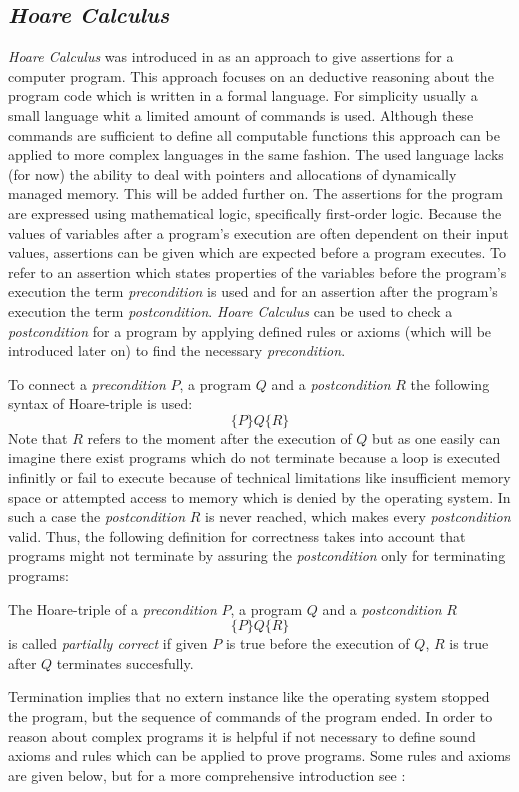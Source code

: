 	\subsection{\emph{Hoare Calculus}}
	\emph{Hoare Calculus} was introduced in \cite{hoarecalc} as an approach to
	give assertions for a computer program. This approach focuses on an deductive
	reasoning about the program code which is written in a formal language. For
	simplicity usually a small language whit a limited amount of commands is
	used. Although these commands are sufficient to define all computable functions
	this approach can be applied to more complex languages in the
	same fashion. The used language lacks (for now) the ability to deal with
	pointers and allocations of dynamically managed memory. This will be added
	further on. The assertions for the program are expressed using mathematical
	logic, specifically first-order logic. Because the values of variables
	after a program's execution are often dependent on their input values, assertions
	can be given which are expected before a program
	executes. To refer to an assertion which states properties of the variables
	before the program's execution the term \emph{precondition} is used and for
	an assertion after the program's execution the term \emph{postcondition}.
	\emph{Hoare Calculus} can be used to check a \emph{postcondition} for a
	program by applying defined rules or axioms (which will be introduced
	later on) to find the necessary \emph{precondition}.

	To connect a \emph{precondition} $P$, a program $Q$ and a \emph{postcondition}
	$R$ the following syntax of Hoare-triple is used:
	$$ \{P\}Q\{R\} $$
	Note that $R$ refers to the moment after the execution of $Q$ but as one
	easily can imagine there exist programs which do not terminate because a loop
	is executed infinitly or fail to
	execute because of technical limitations like insufficient memory space or
	attempted access to memory which is denied by the operating system. In
	such a case the \emph{postcondition} $R$ is never reached, which makes every
	\emph{postcondition} valid. Thus, the following definition for correctness 
	takes into account that programs might not terminate by assuring the
	\emph{postcondition} only for terminating programs:
	\begin{mydef}
		The Hoare-triple of a \emph{precondition} $P$, a program $Q$ and a
		\emph{postcondition} $R$
		$$ \{P\}Q\{R\} $$
		is called \emph{partially correct} if given
		$P$ is true before the execution of $Q$, $R$ is true after $Q$ terminates
		succesfully.
	\end{mydef}
	Termination implies that no extern instance like the
	operating system stopped the program, but the sequence of commands of the
	program ended. In order to reason about complex programs it is helpful if not
	necessary to define sound axioms and rules which can be applied to prove
	programs. Some rules and axioms are
	given below, but for a more comprehensive introduction see \cite{hoarecalc}:

